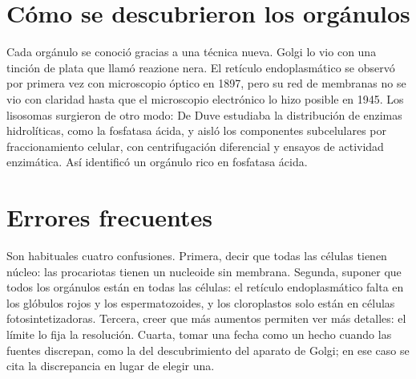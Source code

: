 \documentclass{book}
\begin{document}

\section{Cómo se descubrieron los orgánulos}

Cada orgánulo se conoció gracias a una técnica nueva. Golgi lo vio con una tinción de plata que llamó reazione nera. El retículo endoplasmático se observó por primera vez con microscopio óptico en 1897, pero su red de membranas no se vio con claridad hasta que el microscopio electrónico lo hizo posible en 1945. Los lisosomas surgieron de otro modo: De Duve estudiaba la distribución de enzimas hidrolíticas, como la fosfatasa ácida, y aisló los componentes subcelulares por fraccionamiento celular, con centrifugación diferencial y ensayos de actividad enzimática. Así identificó un orgánulo rico en fosfatasa ácida.


\section{Errores frecuentes}

Son habituales cuatro confusiones. Primera, decir que todas las células tienen núcleo: las procariotas tienen un nucleoide sin membrana. Segunda, suponer que todos los orgánulos están en todas las células: el retículo endoplasmático falta en los glóbulos rojos y los espermatozoides, y los cloroplastos solo están en células fotosintetizadoras. Tercera, creer que más aumentos permiten ver más detalles: el límite lo fija la resolución. Cuarta, tomar una fecha como un hecho cuando las fuentes discrepan, como la del descubrimiento del aparato de Golgi; en ese caso se cita la discrepancia en lugar de elegir una.

\end{document}
